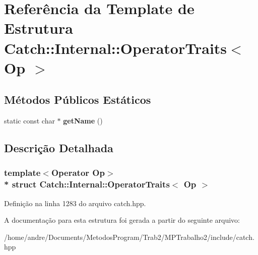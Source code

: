 \hypertarget{structCatch_1_1Internal_1_1OperatorTraits}{}\section{Referência da Template de Estrutura Catch\+:\+:Internal\+:\+:Operator\+Traits$<$ Op $>$}
\label{structCatch_1_1Internal_1_1OperatorTraits}
\subsection*{Métodos Públicos Estáticos}
\begin{DoxyCompactItemize}
\item 
static const char $\ast$ {\bfseries get\+Name} ()\hypertarget{structCatch_1_1Internal_1_1OperatorTraits_ac6d08082ea33348d42bc4ccbd6d07671}{}\label{structCatch_1_1Internal_1_1OperatorTraits_ac6d08082ea33348d42bc4ccbd6d07671}

\end{DoxyCompactItemize}


\subsection{Descrição Detalhada}
\subsubsection*{template$<$Operator Op$>$\\*
struct Catch\+::\+Internal\+::\+Operator\+Traits$<$ Op $>$}



Definição na linha 1283 do arquivo catch.\+hpp.



A documentação para esta estrutura foi gerada a partir do seguinte arquivo\+:\begin{DoxyCompactItemize}
\item 
/home/andre/\+Documents/\+Metodos\+Program/\+Trab2/\+M\+P\+Trabalho2/include/catch.\+hpp\end{DoxyCompactItemize}
